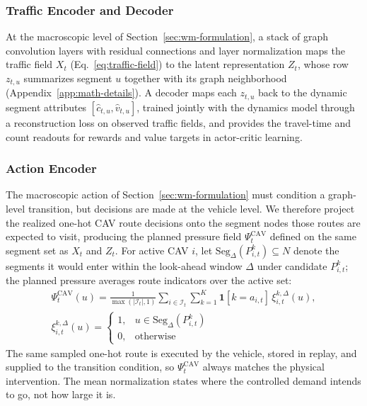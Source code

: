 \subsubsection{Traffic Encoder and Decoder}

At the macroscopic level of Section~\ref{sec:wm-formulation}, a stack of
graph convolution layers with residual connections and layer
normalization maps the traffic field \(X_t\) (Eq.~\ref{eq:traffic-field})
to the latent representation
\(Z_t\), whose row \(z_{t,u}\) summarizes segment \(u\) together with its
graph neighborhood (Appendix~\ref{app:math-details}).  A decoder maps each
\(z_{t,u}\) back to the dynamic segment attributes
\([\hat c_{t,u},\hat v_{t,u}]\), trained jointly with the dynamics model
through a reconstruction loss on observed traffic fields, and provides the
travel-time and count readouts for rewards and value targets in actor-critic
learning.


\subsubsection{Action Encoder}

The macroscopic action of Section~\ref{sec:wm-formulation} must condition a
graph-level transition, but decisions are made at the vehicle level.  We
therefore project the realized one-hot CAV route decisions onto the segment
nodes those routes are expected to visit, producing the planned pressure
field \(\Psi_t^{\mathrm{CAV}}\) defined on the
same segment set as \(X_t\) and \(Z_t\).  For active CAV \(i\), let
\(\mathrm{Seg}_{\Delta}(P^k_{i,t})\subseteq N\) denote the segments it would
enter within the look-ahead window \(\Delta\) under candidate \(P^k_{i,t}\);
the planned pressure averages route indicators over the active set:
\begin{equation}
\begin{array}{rcl}
\Psi_t^{\mathrm{CAV}}(u)
=
\displaystyle
\frac{1}{\max(|\mathcal{I}_t|,1)}
\sum_{i\in\mathcal{I}_t}\sum_{k=1}^{K}
\mathbf{1}[k=a_{i,t}]
\displaystyle
\,\xi_{i,t}^{k,\Delta}(u),\\
\xi_{i,t}^{k,\Delta}(u)
=
\left\{
\begin{array}{ll}
1, & u\in\mathrm{Seg}_{\Delta}(P^k_{i,t})\\
0, & \mathrm{otherwise}
\end{array}
\right.
\end{array}
\end{equation}
The same sampled one-hot route is executed by the vehicle, stored in replay,
and supplied to the transition condition, so \(\Psi_t^{\mathrm{CAV}}\)
always matches the physical intervention.  The mean normalization states
where the controlled demand intends to go, not how large it is.



